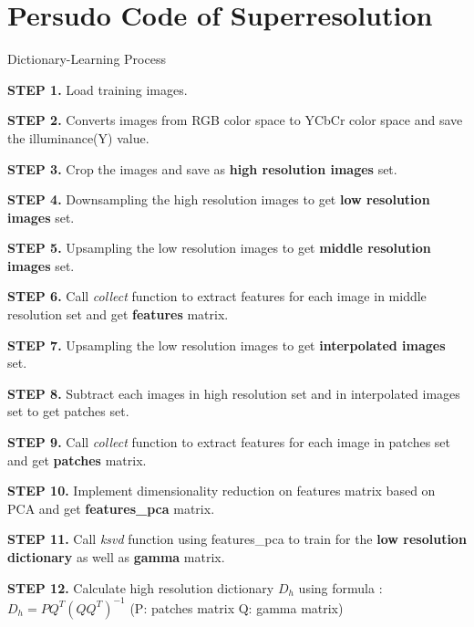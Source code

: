 \documentclass{article}
\begin{document}
\section{Persudo Code of Superresolution}
\begin{algorithm}[H]
	\caption{Dictionary-Learning Process} 
	\label{alg1}
	\begin{algorithmic}
            \STATE \textbf{STEP  1.} Load training images.
            
            \STATE \textbf{STEP  2.} Converts images from RGB color space to YCbCr color space and save the illuminance(Y) value.
            
            \STATE \textbf{STEP  3.} Crop the images and save as \textbf{high resolution images} set.
            
            \STATE \textbf{STEP  4.} Downsampling the high resolution images to get \textbf{low resolution images} set.
            
            \STATE \textbf{STEP  5.} Upsampling the low resolution images to get \textbf{middle resolution images} set.
            
            \STATE \textbf{STEP  6.} Call \textit{collect} function to extract features for each image in middle resolution set and get \textbf{features} matrix.
            
            \STATE \textbf{STEP  7.} Upsampling the low resolution images to get  \textbf{interpolated images} set.
            
            \STATE \textbf{STEP  8.} Subtract each images in high resolution set and in interpolated images set to get patches set.
            
            \STATE \textbf{STEP  9.} Call \textit{collect} function to extract features for each image in patches set and get \textbf{patches} matrix.
            
            \STATE \textbf{STEP 10.} Implement dimensionality reduction on features matrix based on PCA and get \textbf{features\_pca} matrix.
            
            \STATE \textbf{STEP 11.} Call \textit{ksvd} function using features\_pca to train for the \textbf{low resolution dictionary} as well as \textbf{gamma} matrix.
            
            \STATE \textbf{STEP 12.} Calculate high resolution dictionary $D_h$ using formula : $D_h = PQ^T(QQ^T)^{-1}$  (P: patches matrix  Q: gamma matrix)

	\end{algorithmic}
\end{algorithm}
\end{document}
